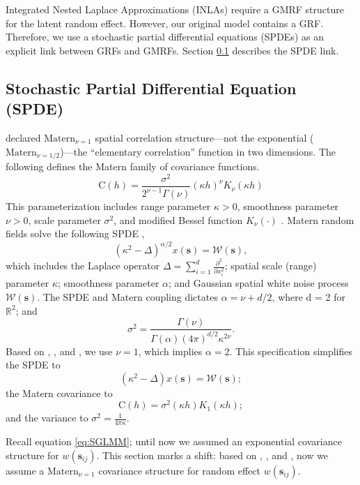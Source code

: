 Integrated Nested Laplace Approximations (INLAs) require a GMRF structure for the latent random effect. However, our original model contains a GRF. Therefore, we use a stochastic partial differential equations (SPDEs) as an explicit link between GRFs and GMRFs. Section \ref{SPDE} describes the SPDE link. 

\subsection{Stochastic Partial Differential Equation (SPDE)} \label{SPDE}

\cite{Whittle1954} declared $\text{Matern}_{\nu = 1}$ spatial correlation structure---not the exponential ($\text{Matern}_{\nu = 1/2}$)---the ``elementary correlation'' function in two dimensions. The following defines the Matern family of covariance functions.
$$\text{C}(h) = \frac{\sigma^{2}}{2^{\nu - 1}\Gamma(\nu)}(\kappa h)^{\nu}K_{\nu}(\kappa h)$$
This parameterization includes range parameter $\kappa > 0$, smoothness parameter $\nu > 0$, scale parameter $\sigma^{2}$, and modified Bessel function $K_{\nu}(\cdot)$ \citep{Schabenberger2004}. Matern random fields solve the following SPDE \citep{Whittle1954},
\begin{equation} \label{eq:spde1}
(\kappa^{2} - \Delta)^{\alpha/2}x(\pmb{s}) = \mathcal{W}(\pmb{s}),
\end{equation}
which includes the Laplace operator $\Delta = \sum_{i=1}^{d} \frac{\partial^{2}}{\partial x_{i}^{2}}$; spatial scale (range) parameter $\kappa$; smoothness parameter $\alpha$; and Gaussian spatial white noise process $\mathcal{W}(\pmb{s})$. The SPDE and Matern coupling dictates $\alpha = \nu + d/2$, where d = 2 for $\mathbb{R}^{2}$; and $$\sigma^{2} = \frac{\Gamma(\nu)}{\Gamma(\alpha)(4\pi)^{d/2}\kappa^{2\nu}}.$$
Based on \citep{Whittle1954}, \citep{Mondal2017}, and \citep{Lindgren2015}, we use $\nu = 1$, which implies $\alpha = 2$. This specification simplifies the SPDE to 
\begin{equation} \label{eq:spde}
(\kappa^{2} - \Delta)x(\pmb{s}) = \mathcal{W}(\pmb{s});
\end{equation}
the Matern covariance to 
\begin{equation} \label{eq:matern}
\text{C}(h) = \sigma^{2}(\kappa h)K_{1}(\kappa h);
\end{equation}
and the variance to $\sigma^{2} = \frac{1}{4 \pi \kappa}$.

Recall equation \ref{eq:SGLMM}; until now we assumed an exponential covariance structure for $w(\pmb{s}_{ij})$. This section marks a shift: based on \citep{Whittle1954}, \citep{Mondal2017}, and \citep{Lindgren2015}, now we assume a $\text{Matern}_{\nu = 1}$ covariance structure for random effect $w(\pmb{s}_{ij})$. 

